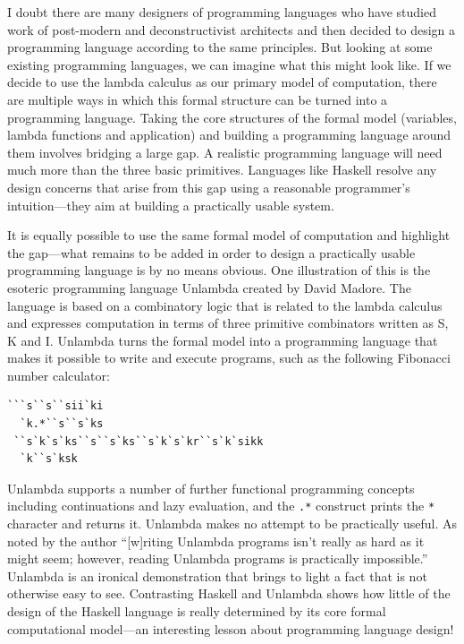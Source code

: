 I doubt there are many designers of programming languages who have studied work of post-modern
and deconstructivist architects and then decided to design a programming language according to
the same principles. But looking at some existing programming languages, we can imagine what
this might look like. If we decide to use the lambda calculus as our primary model of computation,
there are multiple ways in which this formal structure can be turned into a programming language.
Taking the core structures of the formal model (variables, lambda functions and application) and
building a programming language around them involves bridging a large gap.
A realistic programming language will need much more than the three basic primitives. Languages like
Haskell resolve any design concerns that arise from this gap using a reasonable programmer's
intuition---they aim at building a practically usable system.

It is equally possible to use the same formal model of computation and highlight the gap---what
remains to be added in order to design a practically usable programming language is by
no means obvious. One illustration of this is the esoteric programming language
Unlambda created by David Madore. The language is based on a
combinatory logic that is related to the lambda calculus and expresses computation in terms
of three primitive combinators written as S, K and I. Unlambda turns the formal model into a
programming language that makes it possible to write and execute programs, such as the following
Fibonacci number calculator:

\begin{lstlisting}
```s``s``sii`ki
  `k.*``s``s`ks
 ``s`k`s`ks``s``s`ks``s`k`s`kr``s`k`sikk
  `k``s`ksk
\end{lstlisting}

Unlambda supports a number of further functional programming concepts including continuations
and lazy evaluation, and the \texttt{.*} construct prints the \texttt{*} character and returns it.
Unlambda makes no attempt to be practically useful. As noted by the author ``[w]riting Unlambda
programs isn't really as hard as it might seem; however, reading Unlambda programs is practically
impossible.''
Unlambda is an ironical demonstration that brings to light a fact that is not otherwise easy
to see. Contrasting Haskell and Unlambda shows how little of the design of the Haskell language is
really determined by its core formal computational model---an interesting lesson about programming
language design!


